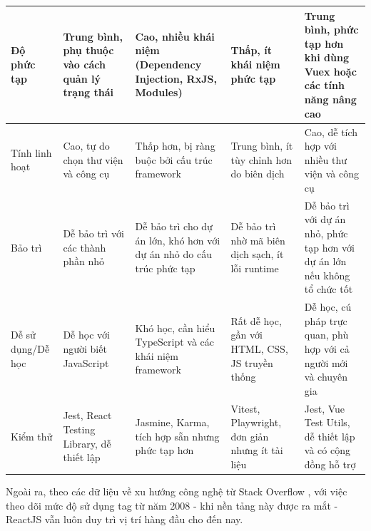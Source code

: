 \begin{enumerate}[(a)]
\begin{landscape}
\begin{longtable}{|p{3.5cm}|p{5cm}|p{5cm}|p{5cm}|p{5cm}|}
			      \hline
			      Độ phức tạp          & Trung bình, phụ thuộc vào cách quản lý trạng thái             & Cao, nhiều khái niệm (Dependency Injection, RxJS, Modules)                  & Thấp, ít khái niệm phức tạp                                                 & Trung bình, phức tạp hơn khi dùng Vuex hoặc các tính năng nâng cao         \\
			      \hline
			      Tính linh hoạt       & Cao, tự do chọn thư viện và công cụ                           & Thấp hơn, bị ràng buộc bởi cấu trúc framework                               & Trung bình, ít tùy chỉnh hơn do biên dịch                                   & Cao, dễ tích hợp với nhiều thư viện và công cụ                             \\
			      \hline
			      Bảo trì              & Dễ bảo trì với các thành phần nhỏ                             & Dễ bảo trì cho dự án lớn, khó hơn với dự án nhỏ do cấu trúc phức tạp        & Dễ bảo trì nhờ mã biên dịch sạch, ít lỗi runtime                            & Dễ bảo trì với dự án nhỏ, phức tạp hơn với dự án lớn nếu không tổ chức tốt \\
			      \hline
			      Dễ sử dụng/Dễ học    & Dễ học với người biết JavaScript                              & Khó học, cần hiểu TypeScript và các khái niệm framework                     & Rất dễ học, gần với HTML, CSS, JS truyền thống                              & Dễ học, cú pháp trực quan, phù hợp với cả người mới và chuyên gia          \\
			      \hline
			      Kiểm thử             & Jest, React Testing Library, dễ thiết lập                     & Jasmine, Karma, tích hợp sẵn nhưng phức tạp hơn                             & Vitest, Playwright, đơn giản nhưng ít tài liệu                              & Jest, Vue Test Utils, dễ thiết lập và có cộng đồng hỗ trợ                  \\
			      \hline
		      \end{longtable}
	      \end{landscape}

	      Ngoài ra, theo các dữ liệu về xu hướng công nghệ từ Stack Overflow \cite{FrontendFrameworks}, với việc theo dõi mức độ sử dụng tag từ năm 2008 - khi nền tảng này được ra mắt - ReactJS vẫn luôn duy trì vị trí hàng đầu cho đến nay.


\end{enumerate}
